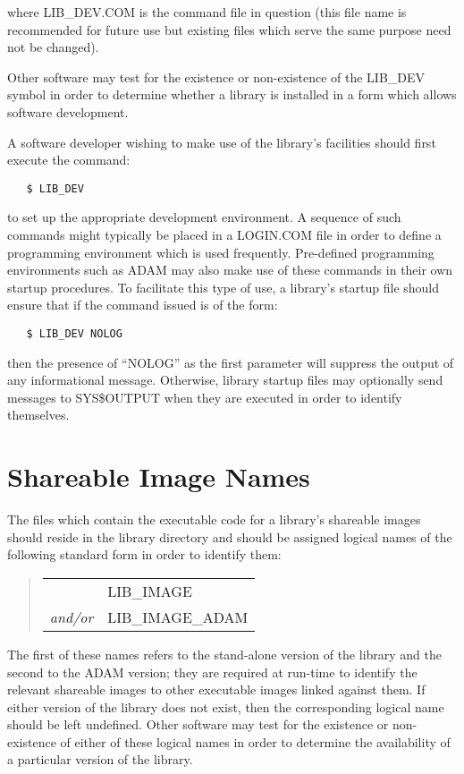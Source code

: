 where LIB\_DEV.COM is the command file in question (this file name is
recommended for future use but existing files which serve the same purpose
need not be changed).

Other software may test for the existence or non-existence of the LIB\_DEV
symbol in order to determine whether a library is installed in a form which
allows software development. 

A software developer wishing to make use of the library's facilities should
first execute the command: 

\begin{verbatim}
   $ LIB_DEV
\end{verbatim}

to set up the appropriate development environment.
A sequence of such commands might typically be placed in a LOGIN.COM file in
order to define a programming environment which is used frequently. 
Pre-defined programming environments such as ADAM may also make use of these
commands in their own startup procedures. 
To facilitate this type of use, a library's startup file should ensure that
if the command issued is of the form: 

\begin{verbatim}
   $ LIB_DEV NOLOG
\end{verbatim}

then the presence of ``NOLOG'' as the first parameter will suppress the
output of any informational message. 
Otherwise, library startup files may optionally send messages to SYS\$OUTPUT
when they are executed in order to identify themselves.

\section{Shareable Image Names}
\label{ss:imagenames}

The files which contain the executable code for a library's shareable
images should reside in the library directory and should be assigned logical
names of the following standard form in order to identify them: 

\begin{quote}
\begin{tabular}{rl}
& LIB\_IMAGE\\
{\em and/or} & LIB\_IMAGE\_ADAM
\end{tabular}
\end{quote}

The first of these names refers to the stand-alone version of the library
and the second to the ADAM version; they are required at run-time to
identify the relevant shareable images to other executable images linked
against them. 
If either version of the library does not exist, then the corresponding
logical name should be left undefined. 
Other software may test for the existence or non-existence of either of these
logical names in order to determine the availability of a particular version
of the library.

